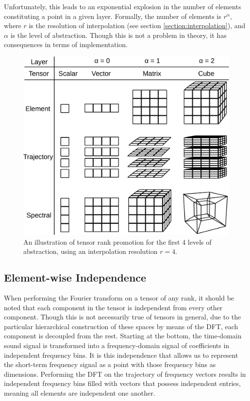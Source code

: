 Unfortunately, this leads to an exponential explosion in the number of elements constituting a point in a given layer.  Formally, the number of elements is $r^\alpha$, where $r$ is the resolution of interpolation (see section \ref{section:interpolation}), and $\alpha$ is the level of abstraction.  Though this is not a problem in theory, it has consequences in terms of implementation.

\begin{figure}
  \centering
  \includegraphics[width=\linewidth]{fig/tensor-rank-promotion.pdf}
  \caption{An illustration of tensor rank promotion for the first 4 levels of abstraction, using an interpolation resolution $r = 4$.  }
  \label{figure:tensor-rank-promotion}
\end{figure}

\subsection{Element-wise Independence}
\label{section:elementwise-independence}

When performing the Fourier transform on a tensor of any rank, it should be noted that each component in the tensor is independent from every other component.  Though this is not necessarily true of tensors in general, due to the particular hierarchical construction of these spaces by means of the DFT, each component is decoupled from the rest.  Starting at the bottom, the time-domain sound signal is transformed into a frequency-domain signal of coefficients in independent frequency bins.  It is this independence that allows us to represent the short-term frequency signal as a point with those frequency bins as dimensions.  Performing the DFT on the trajectory of frequency vectors results in independent frequency bins filled with vectors that possess independent entries, meaning all elements are independent one another.

